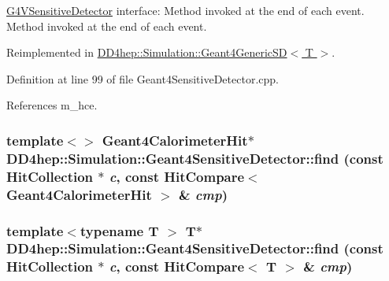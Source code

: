 \hyperlink{class_g4_v_sensitive_detector}{G4VSensitiveDetector} interface: Method invoked at the end of each event. Method invoked at the end of each event. 

Reimplemented in \hyperlink{class_d_d4hep_1_1_simulation_1_1_geant4_generic_s_d_a07009f3334d1f7125c128cc59fc20e6e}{DD4hep::Simulation::Geant4GenericSD$<$ T $>$}.

Definition at line 99 of file Geant4SensitiveDetector.cpp.

References m\_\-hce.\hypertarget{class_d_d4hep_1_1_simulation_1_1_geant4_sensitive_detector_aa3245e74ef546a9aec6cb2c34d2adedb}{
\subsubsection[{find}]{\setlength{\rightskip}{0pt plus 5cm}template$<$$>$ {\bf Geant4CalorimeterHit}$\ast$ DD4hep::Simulation::Geant4SensitiveDetector::find (const {\bf HitCollection} $\ast$ {\em c}, \/  const {\bf HitCompare}$<$ {\bf Geant4CalorimeterHit} $>$ \& {\em cmp})}}
\label{class_d_d4hep_1_1_simulation_1_1_geant4_sensitive_detector_aa3245e74ef546a9aec6cb2c34d2adedb}
\hypertarget{class_d_d4hep_1_1_simulation_1_1_geant4_sensitive_detector_a04d024952896041576da2d022d80cc08}{
\subsubsection[{find}]{\setlength{\rightskip}{0pt plus 5cm}template$<$typename T $>$ {\bf T}$\ast$ DD4hep::Simulation::Geant4SensitiveDetector::find (const {\bf HitCollection} $\ast$ {\em c}, \/  const {\bf HitCompare}$<$ {\bf T} $>$ \& {\em cmp})}}
\label{class_d_d4hep_1_1_simulation_1_1_geant4_sensitive_detector_a04d024952896041576da2d022d80cc08}


